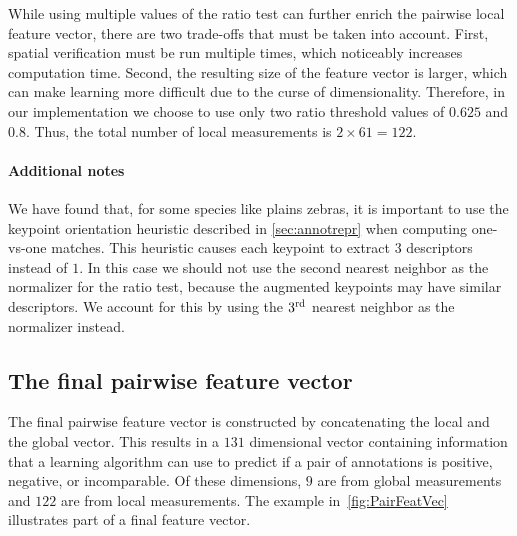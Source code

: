 While using multiple values of the ratio test can further enrich the pairwise local feature vector, there are two
  trade-offs that must be taken into account.
First, spatial verification must be run multiple times, which noticeably increases computation time.
Second, the resulting size of the feature vector is larger, which can make learning more difficult due to the
  curse of dimensionality.
Therefore, in our implementation we choose to use only two ratio threshold values of $0.625$ and $0.8$.
Thus, the total number of local measurements is $2 \times 61 = 122$.

\paragraph{Additional notes}
We have found that, for some species like plains zebras, it is important to use the keypoint orientation
  heuristic described in \cref{sec:annotrepr} when computing one-vs-one matches.
This heuristic causes each keypoint to extract $3$ descriptors instead of $1$.
In this case we should not use the second nearest neighbor as the normalizer for the ratio test, because the
  augmented keypoints may have similar descriptors.
We account for this by using the $3^{\textrm{rd}}{}$ nearest neighbor as the normalizer instead.


\FloatBarrier{}
\subsection{The final pairwise feature vector}

The final pairwise feature vector is constructed by concatenating the local and the global vector.
This results in a $131$ dimensional vector containing information that a learning algorithm can use to predict if
  a pair of annotations is positive, negative, or incomparable.
Of these dimensions, $9$ are from global measurements and $122$ are from local measurements.
The example in~\cref{fig:PairFeatVec} illustrates part of a final feature vector.

